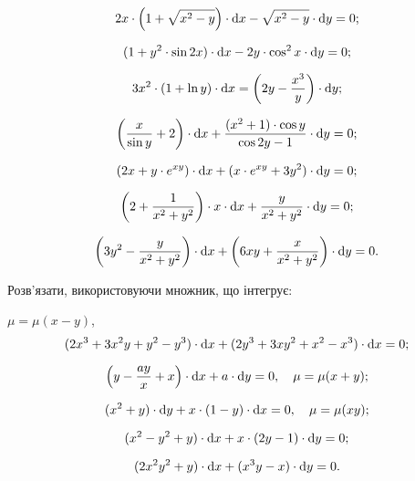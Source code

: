 \begin{problem}
	\[2x\cdot\left(1+\sqrt{x^2-y}\right)\cdot\mathop{}\!\mathrm{d} x-\sqrt{x^2-y}\cdot\mathop{}\!\mathrm{d} y=0;\]
\end{problem}

\begin{problem}
	\[(1+y^2\cdot\sin 2x)\cdot\mathop{}\!\mathrm{d} x-2y\cdot\cos^2x\cdot\mathop{}\!\mathrm{d} y=0;\]
\end{problem}

\begin{problem}
	\[3x^2\cdot(1+\ln y)\cdot\mathop{}\!\mathrm{d} x=\left(2y-\frac{x^3}y\right)\cdot\mathop{}\!\mathrm{d} y;\]
\end{problem}

\begin{problem}
	\[\left(\frac x{\sin y}+2\right)\cdot\mathop{}\!\mathrm{d} x+\frac{(x^2+1)\cdot\cos y}{\cos2y-1}\cdot\mathop{}\!\mathrm{d} y=0;\]
\end{problem}

\begin{problem}
	\[(2x+y\cdot e^{xy})\cdot\mathop{}\!\mathrm{d} x+(x\cdot e^{xy}+3y^2)\cdot\mathop{}\!\mathrm{d} y=0;\]
\end{problem}

\begin{problem}
	\[\left(2+\frac{1}{x^2+y^2}\right)\cdot x\cdot\mathop{}\!\mathrm{d} x+\frac{y}{x^2+y^2}\cdot \mathop{}\!\mathrm{d} y=0;\]
\end{problem}

\begin{problem}
	\[\left(3y^2-\frac{y}{x^2+y^2}\right)\cdot\mathop{}\!\mathrm{d} x+\left(6xy+\frac{x}{x^2+y^2}\right)\cdot \mathop{}\!\mathrm{d} y=0.\]
\end{problem}

Розв'язати, використовуючи множник, що інтегрує:
\begin{problem} $\mu=\mu(x-y)$,
	\[(2x^3+3x^2y+y^2-y^3)\cdot\mathop{}\!\mathrm{d} x+(2y^3+3xy^2+x^2-x^3)\cdot\mathop{}\!\mathrm{d} x=0;\]
\end{problem}

\begin{problem}
	\[ \left(y-\frac{ay}{x}+x\right)\cdot\mathop{}\!\mathrm{d} x+a\cdot\mathop{}\!\mathrm{d} y=0, \quad \mu=\mu(x+y);\]
\end{problem}

\begin{problem}
	\[(x^2+y)\cdot\mathop{}\!\mathrm{d} y+x\cdot(1-y)\cdot\mathop{}\!\mathrm{d} x=0, \quad \mu=\mu(xy);\]
\end{problem}

\begin{problem}
	\[(x^2-y^2+y)\cdot\mathop{}\!\mathrm{d} x+x\cdot(2y-1)\cdot\mathop{}\!\mathrm{d} y=0;\]
\end{problem}

\begin{problem}
	\[(2x^2y^2+y)\cdot\mathop{}\!\mathrm{d} x+(x^3y-x)\cdot\mathop{}\!\mathrm{d} y=0.\]
\end{problem}